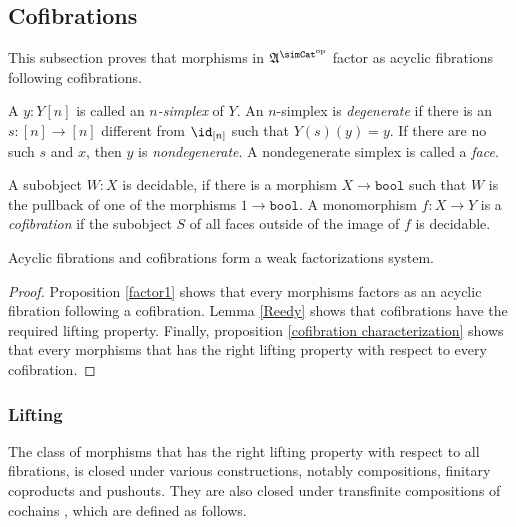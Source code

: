 \documentclass{tac}
\newcommand\hide[1]{}
\newcommand\dual{^{\mathrm{op}}}
\newcommand\s{^{\simCat\dual}}
\newcommand\of{:}
\newcommand\bool{\mathtt{bool}}
\newcommand\ambient{\mathfrak A}
\begin{document}
\hide{ no witnesses }


\subsection{Cofibrations}
This subsection proves that morphisms in $\ambient\s$ factor as acyclic fibrations following cofibrations. 

\begin{definition} A $y\of Y[n]$ is called an \emph{$n$-simplex} of $Y$. An $n$-simplex is \emph{degenerate} if there is an $s\of [n]\to [n]$ different from $\id_{[n]}$ such that $Y(s)(y)=y$. If there are no such $s$ and $x$, then $y$ is \emph{nondegenerate}. A nondegenerate simplex is called a \emph{face}. 

A subobject $W\of X$ is decidable, if there is a morphism $X\to\bool$ such that $W$ is the pullback of one of the morphisms $1\to\bool$. A monomorphism $f\of X\to Y$ is a \emph{cofibration} if the subobject $S$ of all faces outside of the image of $f$ is decidable. \label{cofibration}
\end{definition}

\begin{lemma} Acyclic fibrations and cofibrations form a weak factorizations system.
\end{lemma}

\begin{proof} Proposition \ref{factor1} shows that every morphisms factors as an acyclic fibration following a cofibration. Lemma \ref{Reedy} shows that cofibrations have the required lifting property. Finally, proposition \ref{cofibration characterization} shows that every morphisms that has the right lifting property with respect to every cofibration.
\end{proof}


\subsubsection{Lifting}
The class of morphisms that has the right lifting property with respect to all fibrations, is closed under various constructions, notably compositions, finitary coproducts and pushouts. They are also closed under transfinite compositions of cochains \hide{lemma...}, which are defined as follows.
\end{document}

